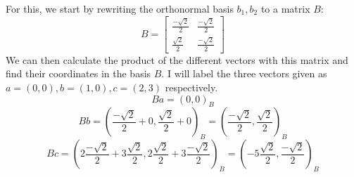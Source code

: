 For this, we start by rewriting the orthonormal basis $b_1, b_2$ to a matrix $B$:
$$
B =
\begin{bmatrix}
\frac{-\sqrt{2}}{2} & \frac{-\sqrt{2}}{2}\\
\frac{\sqrt{2}}{2}  & \frac{-\sqrt{2}}{2}
\end{bmatrix}
$$
We can then calculate the product of the different vectors with this matrix and find their coordinates in the basis $B$. I will label the three vectors given as $a=(0,0),b=(1,0),c=(2,3)$ respectively.
$$
Ba = (0,0)_B
$$
$$
Bb = (\frac{-\sqrt{2}}{2}+0, \frac{\sqrt{2}}{2}+0)_B = (\frac{-\sqrt{2}}{2},\frac{\sqrt{2}}{2})_B
$$
$$
Bc = (2\frac{-\sqrt{2}}{2}+3\frac{\sqrt{2}}{2}, 2\frac{\sqrt{2}}{2} + 3\frac{-\sqrt{2}}{2})_B = (-5\frac{\sqrt{2}}{2},\frac{-\sqrt{2}}{2})_B
$$